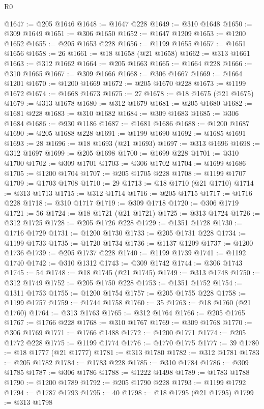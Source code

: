 \begin{lexlean}{R0}
\begin{coremodule}
@1647 := @205 @1646
@1648 := @1647 @228
@1649 := @310 @1648
@1650 := @309 @1649
@1651 := @306 @1650
@1652 := @1647 @1209
@1653 := @1200 @1652
@1655 := @205 @1653 @228
@1656 := @1199 @1655
@1657 := @1651 @1656
@1658 := 26
@1661 := @18 @1658 (@21 @1658)
@1662 := @313 @1661
@1663 := @312 @1662
@1664 := @205 @1663
@1665 := @1664 @228
@1666 := @310 @1665
@1667 := @309 @1666
@1668 := @306 @1667
@1669 := @1664 @1201
@1670 := @1200 @1669
@1672 := @205 @1670 @228
@1673 := @1199 @1672
@1674 := @1668 @1673
@1675 := 27
@1678 := @18 @1675 (@21 @1675)
@1679 := @313 @1678
@1680 := @312 @1679
@1681 := @205 @1680
@1682 := @1681 @228
@1683 := @310 @1682
@1684 := @309 @1683
@1685 := @306 @1684
@1686 := @930 @1186
@1687 := @1681 @1686
@1688 := @1200 @1687
@1690 := @205 @1688 @228
@1691 := @1199 @1690
@1692 := @1685 @1691
@1693 := 28
@1696 := @18 @1693 (@21 @1693)
@1697 := @313 @1696
@1698 := @312 @1697
@1699 := @205 @1698
@1700 := @1699 @228
@1701 := @310 @1700
@1702 := @309 @1701
@1703 := @306 @1702
@1704 := @1699 @1686
@1705 := @1200 @1704
@1707 := @205 @1705 @228
@1708 := @1199 @1707
@1709 := @1703 @1708
@1710 := 29
@1713 := @18 @1710 (@21 @1710)
@1714 := @313 @1713
@1715 := @312 @1714
@1716 := @205 @1715
@1717 := @1716 @228
@1718 := @310 @1717
@1719 := @309 @1718
@1720 := @306 @1719
@1721 := 56
@1724 := @18 @1721 (@21 @1721)
@1725 := @313 @1724
@1726 := @312 @1725
@1728 := @205 @1726 @228
@1729 := @1351 @1728
@1730 := @1716 @1729
@1731 := @1200 @1730
@1733 := @205 @1731 @228
@1734 := @1199 @1733
@1735 := @1720 @1734
@1736 := @1137 @1209
@1737 := @1200 @1736
@1739 := @205 @1737 @228
@1740 := @1199 @1739
@1741 := @1192 @1740
@1742 := @310 @1312
@1743 := @309 @1742
@1744 := @306 @1743
@1745 := 54
@1748 := @18 @1745 (@21 @1745)
@1749 := @313 @1748
@1750 := @312 @1749
@1752 := @205 @1750 @228
@1753 := @1351 @1752
@1754 := @1311 @1753
@1755 := @1200 @1754
@1757 := @205 @1755 @228
@1758 := @1199 @1757
@1759 := @1744 @1758
@1760 := 35
@1763 := @18 @1760 (@21 @1760)
@1764 := @313 @1763
@1765 := @312 @1764
@1766 := @205 @1765
@1767 := @1766 @228
@1768 := @310 @1767
@1769 := @309 @1768
@1770 := @306 @1769
@1771 := @1766 @1488
@1772 := @1200 @1771
@1774 := @205 @1772 @228
@1775 := @1199 @1774
@1776 := @1770 @1775
@1777 := 39
@1780 := @18 @1777 (@21 @1777)
@1781 := @313 @1780
@1782 := @312 @1781
@1783 := @205 @1782
@1784 := @1783 @228
@1785 := @310 @1784
@1786 := @309 @1785
@1787 := @306 @1786
@1788 := @1222 @1498
@1789 := @1783 @1788
@1790 := @1200 @1789
@1792 := @205 @1790 @228
@1793 := @1199 @1792
@1794 := @1787 @1793
@1795 := 40
@1798 := @18 @1795 (@21 @1795)
@1799 := @313 @1798

\end{coremodule}
\end{lexlean}
